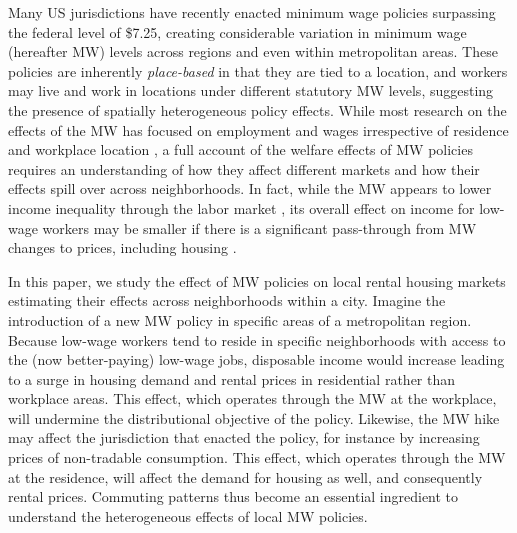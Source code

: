 

Many US jurisdictions have recently enacted minimum wage policies surpassing the 
federal level of \$7.25, creating considerable variation in minimum wage 
(hereafter MW) levels across regions and even within metropolitan areas.
These policies are inherently \textit{place-based} in that they are tied to 
a location, and workers may live and work in locations under different 
statutory MW levels, suggesting the presence of spatially heterogeneous policy 
effects.
While most research on the effects of the MW has focused on employment and 
wages irrespective of residence and workplace location
\parencite[e.g.,][]{CardKrueger1994, CegnizEtAl2019},
a full account of the welfare effects of MW policies requires an understanding 
of how they affect different markets and how their effects spill over across 
neighborhoods.
In fact, while the MW appears to lower income inequality through the labor 
market \parencite{Lee1999, AutorEtAl2016},
its overall effect on income for low-wage workers may be smaller if there is 
a significant pass-through from MW changes to prices, including housing
\parencite{Macurdy2015}.

In this paper, we study the effect of MW policies on local rental housing 
markets estimating their effects across neighborhoods within a city.
Imagine the introduction of a new MW policy in specific areas of a metropolitan 
region.
Because low-wage workers tend to reside in specific neighborhoods with access 
to the (now better-paying) low-wage jobs,
disposable income would increase leading to a surge in housing demand and 
rental prices in residential rather than workplace areas.
This effect, which operates through the MW at the workplace, will undermine 
the distributional objective of the policy.
Likewise, the MW hike may affect the jurisdiction that enacted the policy, for 
instance by increasing prices of non-tradable consumption.
This effect, which operates through the MW at the residence, will affect the 
demand for housing as well, and consequently rental prices.
Commuting patterns thus become an essential ingredient to understand the 
heterogeneous effects of local MW policies.

